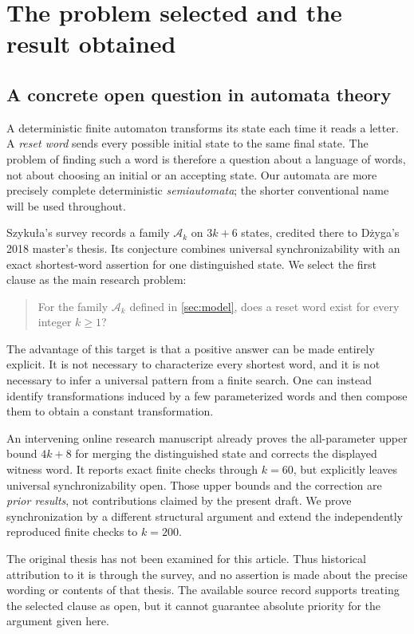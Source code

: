 \documentclass[11pt,a4paper]{article}
\numberwithin{equation}{section}
\theoremstyle{definition}
\theoremstyle{remark}
\newcommand{\Ak}{\mathcal A_k}
\begin{document}
\section{The problem selected and the result obtained}
\label{sec:intro}

\subsection{A concrete open question in automata theory}

A deterministic finite automaton transforms its state each time it reads a
letter. A \emph{reset word} sends every possible initial state to the same
final state. The problem of finding such a word is therefore a question about
a language of words, not about choosing an initial or an accepting state.
Our automata are more precisely complete deterministic \emph{semiautomata};
the shorter conventional name will be used throughout.

Szyku\l a's survey \cite[Section~2.3, Figure~3 and Conjecture~8]{Szykula2026}
records a family $\Ak$ on $3k+6$ states, credited there to D\.{z}yga's 2018
master's thesis. Its conjecture combines universal synchronizability with an
exact shortest-word assertion for one distinguished state. We select the
first clause as the main research problem:
\begin{quote}
For the family $\Ak$ defined in \cref{sec:model}, does a reset word exist for
every integer $k\geq1$?
\end{quote}

The advantage of this target is that a positive answer can be made entirely
explicit. It is not necessary to characterize every shortest word, and it is
not necessary to infer a universal pattern from a finite search. One can
instead identify transformations induced by a few parameterized words and
then compose them to obtain a constant transformation.

An intervening online research manuscript \cite{MM2026} already proves the
all-parameter upper bound $4k+8$ for merging the distinguished state and
corrects the displayed witness word. It reports exact finite checks through
$k=60$, but explicitly leaves universal synchronizability open. Those upper
bounds and the correction are \emph{prior results}, not contributions claimed
by the present draft. We prove synchronization by a different structural
argument and extend the independently reproduced finite checks to $k=200$.

The original thesis has not been examined for this article. Thus historical
attribution to it is through the survey, and no assertion is made about the
precise wording or contents of that thesis. The available source record
supports treating the selected clause as open, but it cannot guarantee
absolute priority for the argument given here.
\end{document}
